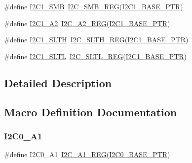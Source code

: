 \begin{DoxyCompactItemize}
\item 
\#define \hyperlink{group___i2_c___register___accessor___macros_gaa9377a6d31b5c6a841b69330a6e8d59d}{I2\+C1\+\_\+\+S\+MB}~\hyperlink{group___i2_c___register___accessor___macros_ga320d358df195778429696e7755acc5e8}{I2\+C\+\_\+\+S\+M\+B\+\_\+\+R\+EG}(\hyperlink{group___i2_c___peripheral_gae13da5d584f2a4e2379db927a3f18772}{I2\+C1\+\_\+\+B\+A\+S\+E\+\_\+\+P\+TR})
\item 
\#define \hyperlink{group___i2_c___register___accessor___macros_gaa4539c51795162a3fccf19384acf78f0}{I2\+C1\+\_\+\+A2}~\hyperlink{group___i2_c___register___accessor___macros_ga654554108023356beab5b561b7787139}{I2\+C\+\_\+\+A2\+\_\+\+R\+EG}(\hyperlink{group___i2_c___peripheral_gae13da5d584f2a4e2379db927a3f18772}{I2\+C1\+\_\+\+B\+A\+S\+E\+\_\+\+P\+TR})
\item 
\#define \hyperlink{group___i2_c___register___accessor___macros_ga636aa70cc9b9d94328cecb67e0005e7b}{I2\+C1\+\_\+\+S\+L\+TH}~\hyperlink{group___i2_c___register___accessor___macros_ga7d186ff953fe05d9360350072353470f}{I2\+C\+\_\+\+S\+L\+T\+H\+\_\+\+R\+EG}(\hyperlink{group___i2_c___peripheral_gae13da5d584f2a4e2379db927a3f18772}{I2\+C1\+\_\+\+B\+A\+S\+E\+\_\+\+P\+TR})
\item 
\#define \hyperlink{group___i2_c___register___accessor___macros_ga1d6d67136378cdc43250d350dde35366}{I2\+C1\+\_\+\+S\+L\+TL}~\hyperlink{group___i2_c___register___accessor___macros_gadcf8cbbf29297a34a28c6daec4a117fb}{I2\+C\+\_\+\+S\+L\+T\+L\+\_\+\+R\+EG}(\hyperlink{group___i2_c___peripheral_gae13da5d584f2a4e2379db927a3f18772}{I2\+C1\+\_\+\+B\+A\+S\+E\+\_\+\+P\+TR})
\end{DoxyCompactItemize}


\subsection{Detailed Description}


\subsection{Macro Definition Documentation}
\mbox{\label{group___i2_c___register___accessor___macros_gaab25b2cfc0f440c11ba84defee435e0e}} 
\subsubsection{\texorpdfstring{I2\+C0\+\_\+\+A1}{I2C0\_A1}}
{\footnotesize\ttfamily \#define I2\+C0\+\_\+\+A1~\hyperlink{group___i2_c___register___accessor___macros_gaa114fe991a3e1e899b53160c91bd8c72}{I2\+C\+\_\+\+A1\+\_\+\+R\+EG}(\hyperlink{group___i2_c___peripheral_ga6db92fda81fa3b6a1c8c6a85e66d51a0}{I2\+C0\+\_\+\+B\+A\+S\+E\+\_\+\+P\+TR})}

